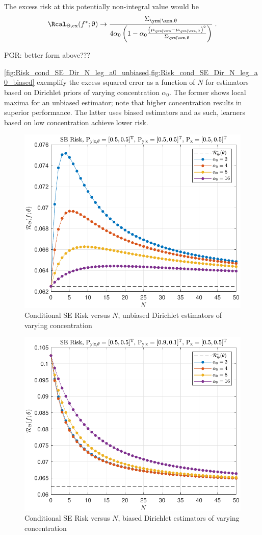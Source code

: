 \documentclass[12pt]{report}
\begin{document}
The excess risk at this potentially non-integral value would be 
\begin{equation}
\Rcal_{\Theta, \mathrm{ex}}(f^* ; \uptheta) \to \frac{\Sigma_{\yrm | \xrm,\uptheta}}{4 \alpha_0 \left( 1 - \alpha_0 \frac{\left( \mu_{\yrm | \xrm} - \mu_{\yrm | \xrm,\uptheta} \right)^2}{\Sigma_{\yrm | \xrm,\uptheta}} \right)} \;.
\end{equation}

PGR: better form above???


\cref{fig:Risk_cond_SE_Dir_N_leg_a0_unbiased,fig:Risk_cond_SE_Dir_N_leg_a0_biased} exemplify the excess squared error as a function of $N$ for estimators based on Dirichlet priors of varying concentration $\alpha_0$. The former shows local maxima for an unbiased estimator; note that higher concentration results in superior performance. The latter uses biased estimators and as such, learners based on low concentration achieve lower risk.
\begin{figure}
\centering
\includegraphics[width=0.7\linewidth]{Risk_cond_SE_Dir_N_leg_a0_unbiased.pdf}
\caption{Conditional SE Risk versus $N$, unbiased Dirichlet estimators of varying concentration}
\label{fig:Risk_cond_SE_Dir_N_leg_a0_unbiased}
\end{figure}
\begin{figure}
\centering
\includegraphics[width=0.7\linewidth]{Risk_cond_SE_Dir_N_leg_a0_biased.pdf}
\caption{Conditional SE Risk versus $N$, biased Dirichlet estimators of varying concentration}
\label{fig:Risk_cond_SE_Dir_N_leg_a0_biased}
\end{figure}
\end{document}
